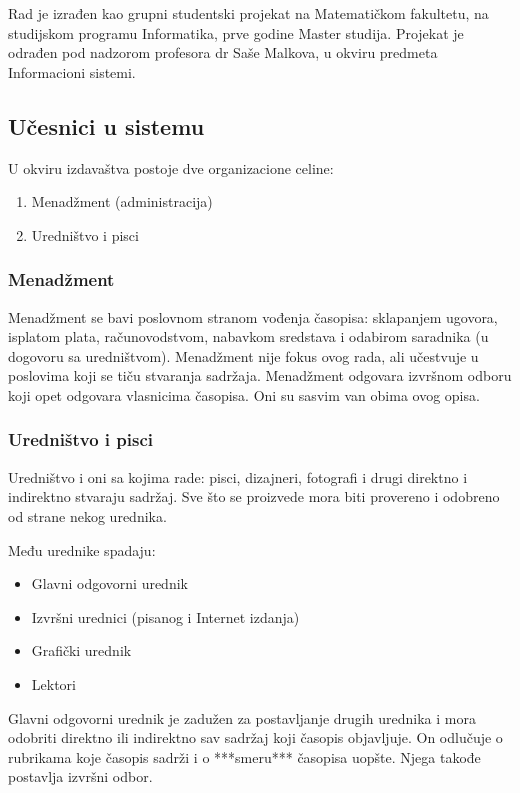 \documentclass[a4paper,12pt]{extarticle}
\begin{document}
Rad je izrađen kao grupni studentski projekat na Matematičkom fakultetu, na studijskom
programu Informatika, prve godine Master studija. Projekat je odrađen pod nadzorom profesora dr Saše Malkova, u okviru predmeta Informacioni sistemi. \\

\subsection{Učesnici u sistemu}

U okviru izdavaštva postoje dve organizacione celine:
\begin{enumerate}
\item Menadžment (administracija)
\item Uredništvo i pisci
\end{enumerate}

\subsubsection{Menadžment}

Menadžment se bavi poslovnom stranom vođenja časopisa: sklapanjem ugovora, isplatom plata, računovodstvom, nabavkom sredstava i odabirom saradnika (u dogovoru sa uredništvom).
Menadžment nije fokus ovog rada, ali učestvuje u poslovima koji se tiču stvaranja sadržaja. Menadžment odgovara izvršnom odboru koji opet odgovara vlasnicima časopisa. Oni su sasvim van obima ovog opisa.

\subsubsection{Uredništvo i pisci}

Uredništvo i oni sa kojima rade: pisci, dizajneri, fotografi i drugi direktno i indirektno stvaraju sadržaj. Sve što se proizvede mora biti provereno i odobreno od strane nekog urednika. 

Među urednike spadaju:
\begin{itemize}
\item Glavni odgovorni urednik
\item Izvršni urednici (pisanog i Internet izdanja)
\item Grafički urednik
\item Lektori
\end{itemize}

Glavni odgovorni urednik je zadužen za postavljanje drugih urednika i mora odobriti direktno ili indirektno sav sadržaj koji časopis objavljuje. On odlučuje o rubrikama koje časopis sadrži i o ***smeru*** časopisa uopšte. Njega takođe postavlja izvršni odbor. \\
\end{document}
